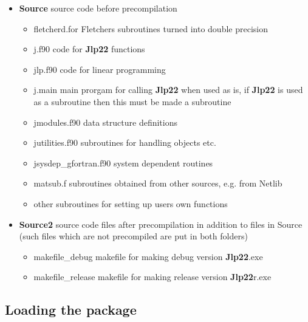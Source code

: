 \begin{itemize}
\item \textbf{Source} \hspace{0.2cm} source code before precompilation 
\begin{itemize} 
\item fletcherd.for \hspace{0.2cm}Fletchers subroutines turned into double precision 
\item j.f90 \hspace{0.2cm}code for \textbf{Jlp22} functions 
\item jlp.f90 \hspace{0.2cm}code for linear programming 
\item j.main \hspace{0.2cm}main prorgam for calling \textbf{Jlp22} when used as is, if \textbf{Jlp22} is used as 
a subroutine then this must be made a subroutine 
\item jmodules.f90 \hspace{0.2cm}data structure definitions 
\item jutilities.f90 \hspace{0.2cm}subroutines for handling objects etc. 
\item jsysdep\_gfortran.f90 \hspace{0.2cm}system dependent routines 
\item matsub.f \hspace{0.2cm}subroutines obtained from other sources, e.g. from Netlib 
\item other subroutines for setting up users own  functions 
\end{itemize} 
 
\item\textbf{Source2} \hspace{0.2cm} source code files after precompilation 
in addition to files in Source (such files which are not precompiled are put in both folders) 
\begin{itemize} 
\item makefile\_debug \hspace{0.2cm}makefile for making debug version \textbf{Jlp22}.exe 
\item makefile\_release\hspace{0.2cm} makefile for making release version \textbf{Jlp22}r.exe 
\end{itemize} 
 
 
\end{itemize} 
 
\subsection{Loading the package} 
\label{gitload} 
 
